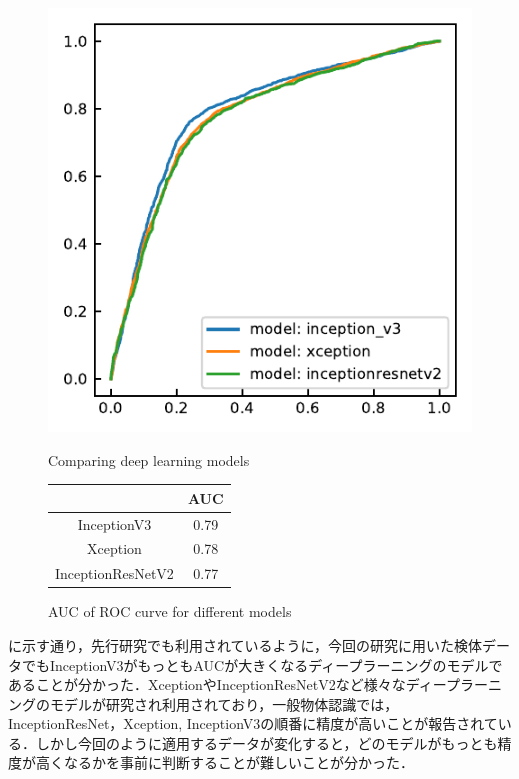 \begin{figure}[H]
	\centering
	\begin{minipage}{0.5\columnwidth}
		\centering
		\includegraphics[width=\linewidth]{fig/chapter4/2dcnn_model}
		\caption{Comparing deep learning models}
		\label{fig:2dcnnmodel}
	\end{minipage}
	\makeatletter
	\def\@captype{table}
	\makeatother
	\begin{minipage}{0.4\columnwidth}
		\centering
		\caption{AUC of ROC curve for different models}
		\label{tab:2DCNNcompare_AUC}
		\begin{tabular}{cc}\toprule
			& AUC \\ \midrule
			InceptionV3 & 0.79 \\ 
			Xception & 0.78 \\ 
			InceptionResNetV2 & 0.77 \\ \bottomrule
		\end{tabular} 
	\end{minipage}
\end{figure}

に示す通り，先行研究でも利用されているように，今回の研究に用いた検体データでもInceptionV3がもっともAUCが大きくなるディープラーニングのモデルであることが分かった．XceptionやInceptionResNetV2など様々なディープラーニングのモデルが研究され利用されており，一般物体認識では，InceptionResNet，Xception, InceptionV3の順番に精度が高いことが報告されている．しかし今回のように適用するデータが変化すると，どのモデルがもっとも精度が高くなるかを事前に判断することが難しいことが分かった．

